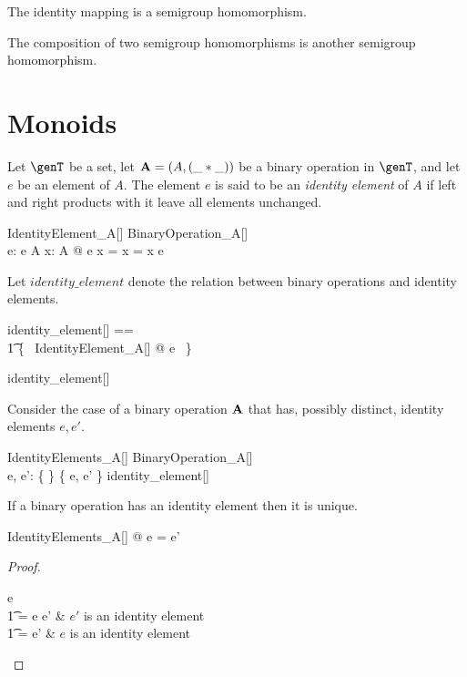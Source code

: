 \documentclass{amsart}
\begin{document}
\begin{remark}
The identity mapping is a semigroup homomorphism.
\end{remark}

\begin{remark}
The composition of two semigroup homomorphisms is another semigroup homomorphism.
\end{remark}

\section{Monoids}

Let $\genT$ be a set, let $\mathbf{A} = (A, (\_ \mathbin{*} \_))$ be a binary operation in $\genT$, and let $e$ be an element of $A$.
The element $e$ is said to be an \textit{identity element} of $A$ if left and right 
products with it leave all elements unchanged.
\begin{schema}{IdentityElement\_A}[\genT]
	BinaryOperation\_A[\genT] \\
	e: \genT
\where
	e \in A
\also
	\forall x: A @ e \mulA x = x = x \mulA e
\end{schema}

Let $identity\_element$ denote the relation between binary operations and identity elements.
\begin{zed}
	identity\_element[\genT] == \\
	\t1	\{~ IdentityElement\_A[\genT] @ \strucA \mapsto e ~\}
\end{zed}

\begin{remark}
\begin{zed}
	identity\_element[\setT] \in \binop \setT \rel \setT
\end{zed}
\end{remark}

Consider the case of a binary operation $\mathbf{A}$ that has, possibly distinct, identity elements $e, e'$.
\begin{schema}{IdentityElements\_A}[\genT]
	BinaryOperation\_A[\genT] \\
	e, e': \genT
\where
	\{ \strucA \} \cross \{ e, e' \} \subseteq identity\_element[\genT]
\end{schema}

\begin{remark}
If a binary operation has an identity element then it is unique.

\begin{zed}
	\forall IdentityElements\_A[\setT] @ e = e'
\end{zed}

\begin{proof}
\begin{argue}
e \\
\t1	= e \mulA e'	& $e'$ is an identity element \\
\t1	= e'			& $e$ is an identity element
\end{argue}
\end{proof}

\end{remark}
\end{document}
